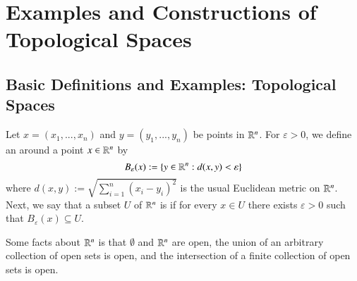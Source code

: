 %
%
%
\chapter{Examples and Constructions of Topological Spaces}
\label{GenTop} %

\section{Basic Definitions and Examples: Topological Spaces}


\begin{example}
    Let $x = (x_1,...,x_n)$ and $y=(y_1,...,y_n)$ be points in $\mathbb R^n$. For $\varepsilon > 0$, we define an  around a point $x \in \mathbb R^n$ by \begin{equation*}
        B_{\varepsilon}(x) := \{y \in \mathbb R^n:d(x,y) < \varepsilon\}
    \end{equation*}
    where $d(x,y):=\sqrt{\sum_{i=1}^n(x_i-y_i)^2}$ is the usual Euclidean metric on $\mathbb R^n$. Next, we say that a subset $U$ of $\mathbb R^n$ is  if for every $x \in U$ there exists $\varepsilon > 0$ such that $B_{\varepsilon}(x) \subseteq U$. 

    Some facts about $\mathbb R^n$ is that $\emptyset$ and $\mathbb R^n$ are open, the union of an arbitrary collection of open sets is open, and the intersection of a finite collection of open sets is open. 
\end{example}

